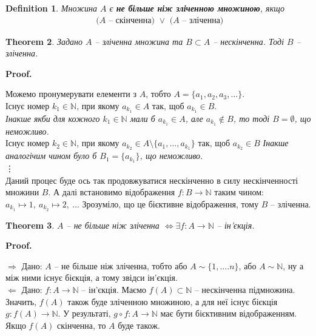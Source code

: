 \documentclass[a4paper, 14pt]{extarticle}
\makeatletter
\def\rightproof{$\boxed{\Rightarrow}$ }
\def\leftproof{$\boxed{\Leftarrow}$ }
\theoremstyle{theoremdd}
\newtheorem{theorem}{Theorem}[subsection]
\theoremstyle{theoremdd}
\newtheorem{definition}[theorem]{Definition}
\theoremstyle{theoremdd}
\theoremstyle{theoremdd}
\theoremstyle{theoremdd}
\theoremstyle{theoremdd}
\theoremstyle{theoremdd}
\theoremstyle{theoremdd}
\theoremstyle{theoremdd}
\theoremstyle{theoremdd}
\theoremstyle{theoremdd}
\theoremstyle{theoremdd}
\theoremstyle{theoremdd}
\theoremstyle{theoremdd}
\theoremstyle{theoremdd}
\renewenvironment{proof}[1][Proof.\\]{\par
\pushQED{\hfill \qed}%
\normalfont \topsep6\p@\@plus6\p@\relax
\trivlist
\item\relax
{\bfseries
#1\@addpunct{.}}\hspace\labelsep\ignorespaces
}{%
\popQED\endtrivlist\@endpefalse
}
\makeatother
\begin{document}
\begin{definition}
Множина $A$ є \textbf{не більше ніж зліченною множиною}, якщо
\begin{align*}
\text{ ($A$ -- скінченна) $\vee $ ($A$ -- зліченна)}
\end{align*}
\end{definition}

\begin{theorem}
Задано $A$ -- зліченна множина та $B \subset A$ -- нескінченна. Тоді $B$ -- зліченна.
\end{theorem}

\begin{proof}
Можемо пронумерувати елементи з $A$, тобто $A = \{a_1,a_2,a_3,\dots\}$.\\
Існує номер $k_1 \in \mathbb{N}$, при якому $a_{k_1} \in A$ так, щоб $a_{k_1} \in B$. \\
\textit{Інакше якби для кожного $k_1 \in \mathbb{N}$ мали б $a_{k_1} \in A$, але $a_{k_1} \notin B$, то тоді $B = \emptyset$, що неможливо.}\\
Існує номер $k_2 \in \mathbb{N}$, при якому $a_{k_2} \in A \setminus \{a_1,\dots,a_{k_1}\}$ так, щоб $a_{k_2} \in B$
\textit{Інакше аналогічим чином було б $B_1 = \{a_{k_1}\}$, що неможливо.}\\
\vdots \\
Даний процес буде ось так продовжуватися нескінченно в силу нескінченності множини $B$. А далі встановимо відображення $f \colon B \to \mathbb{N}$ таким чином: $a_{k_1} \mapsto 1,\ a_{k_2} \mapsto 2,\ \dots$ Зрозуміло, що це бієктивне відображення, тому $B$ -- зліченна.
\end{proof}

\begin{theorem}
$A$ -- не більше ніж зліченна $\iff \exists f \colon A \to \mathbb{N}$ -- ін'єкція.
\end{theorem}

\begin{proof}
\rightproof Дано: $A$ -- не більше ніж зліченна, тобто або $A \sim \{1,\dots.n\}$, або $A \sim \mathbb{N}$, ну а між ними існує бієкція, а тому звідси ін'єкція.
\bigskip \\
\leftproof Дано: $f \colon A \to \mathbb{N}$ -- ін'єкція. Маємо $f(A) \subset \mathbb{N}$ -- нескінченна підмножина. Значить, $f(A)$ також буде зліченною множиною, а для неї існує бієкція $g \colon f(A) \to \mathbb{N}$. У результаті, $g \circ f \colon A \to \mathbb{N}$ має бути бієктивним відображенням. Якщо $f(A)$ скінченна, то $A$ буде також.
\end{proof}
\end{document}
